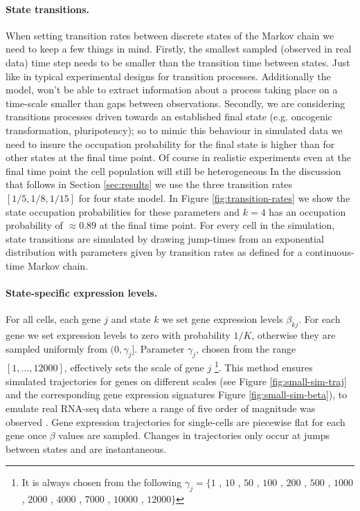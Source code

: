 \paragraph{State transitions.}
\label{sec:state-transitions}
When setting transition rates between discrete states of the Markov chain we need to keep a few things in mind. Firstly, the smallest sampled (observed in real data) time step needs to be smaller than the transition time between states. Just like in typical experimental designs for transition processes. Additionally the model, won't be able to extract information about a process taking place on a time-scale smaller than gaps between observations. Secondly, we are considering transitions processes driven towards an established final state (e.g. oncogenic transformation, pluripotency); so to mimic this behaviour in simulated data we need to insure the occupation probability for the final state is higher than for other states at the final time point. Of course in realistic experiments even at the final time point the cell population will still be heterogeneous In the discussion that follows in Section \ref{sec:results} we use the three transition rates $[1/5, 1/8, 1/15]$ for four state model. In Figure \ref{fig:transition-rates} we show the state occupation probabilities for these parameters and $k=4$ has an occupation probability of $\approx 0.89$ at the final time point. For every cell in the simulation, state transitions are simulated by drawing jump-times from an exponential distribution with parameters given by transition rates as defined for a continuous-time Markov chain.

\paragraph{State-specific expression levels.}
\label{sec:state-spec-expr}
For all cells, each gene $j$ and state $k$ we set gene expression levels $\beta_{kj}$. For each gene we set expression levels to zero with probability $1/K$, otherwise they are sampled uniformly from $(0, \gamma_j]$. Parameter $\gamma_j$, chosen from the range $[1, \ldots, 12000]$, effectively sets the scale of gene $j$ \footnote{It is always chosen from the following $\gamma_j = \lbrace 1$ , $ 10$ , $ 50$ , $ 100$ , $ 200$ , $ 500$ , $ 1000$ , $ 2000$ , $ 4000$ , $ 7000$ , $ 10000$ , $ 12000 \rbrace$}. This method ensures simulated trajectories for genes on different scales (see Figure \ref{fig:small-sim-traj} and the corresponding gene expression signatures Figure \ref{fig:small-sim-beta}), to emulate real RNA-seq data  where a range of five order of magnitude was observed \citep{Wang:2009ur,Mortazavi:2008jj}. Gene expression trajectories for single-cells are piecewise flat for each gene once $\beta$ values are sampled. Changes in trajectories only occur at jumps between states and are instantaneous.

